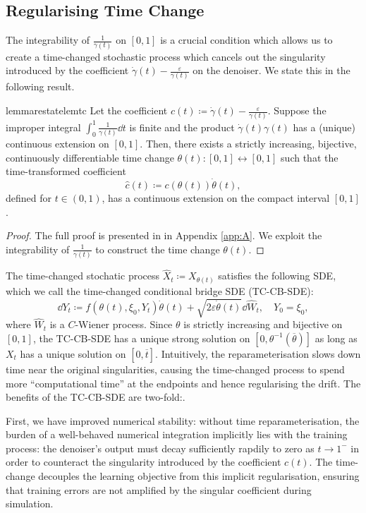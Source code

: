 \subsection{Regularising Time Change}\label{sec:tc}
The integrability of \(\frac{1}{\gamma(t)}\) on \([0, 1]\) is a crucial condition which allows us to create a time-changed stochastic process which cancels out the singularity introduced by the coefficient \(\dot{\gamma}(t) - \frac{\varepsilon}{\gamma(t)}\) on the denoiser. We state this in the following result.
\begin{theorembox}
  \begin{restatable}{lemma}{restatelemtc}\label{lem:tc}
    Let the coefficient \(c(t) \coloneqq \dot{\gamma}(t) - \frac{\varepsilon}{\gamma(t)}\). Suppose the improper integral \(\int_{0}^{1} \frac{1}{\gamma(t)} \dd{t}\) is finite and the product \(\dot{\gamma}(t) \gamma(t) \) has a (unique) continuous extension on \([0, 1]\). Then, there exists a strictly increasing, bijective, continuously differentiable time change \(\theta(t) : [0,1] \leftrightarrow [0, 1]\) such that the time-transformed coefficient
    \[
      \hat{c}(t) \coloneqq c(\theta(t))\dot{\theta}(t),
    \]
    defined for \(t \in (0, 1)\), has a continuous extension on the compact interval \([0, 1]\).
  \end{restatable}
\end{theorembox}
\begin{proof}
  The full proof is presented in  in Appendix \ref{app:A}. We exploit the integrability of \(\frac{1}{\gamma(t)}\) to construct the time change \(\theta(t)\).
\end{proof}
The time-changed stochatic process \(\hat{X}_{t} \coloneqq X_{\theta(t)}\) satisfies the following SDE, which we call the time-changed conditional bridge SDE (TC-CB-SDE):
\[
  \dd{Y_{t}} \coloneqq f(\theta(t), \xi_{0}, Y_{t}) \dot{\theta}(t) + \sqrt{2\varepsilon \dot{\theta}(t)} \dd{ \hat{W}_{t}}, \quad Y_{0} = \xi_{0},
\]
where \(\hat{W}_{t}\)  is a \(C\)-Wiener process. Since \(\theta\) is strictly increasing and bijective on \([0, 1]\), the TC-CB-SDE has a unique strong solution on \([0, \theta^{-1}(\overline{\theta})]\) as long as \(X_{t}\) has a unique solution on \([0, \overline{t}]\). Intuitively, the reparameterisation slows down time near the original singularities, causing the time-changed process to spend more ``computational time'' at the endpoints and hence regularising the drift. The benefits of the TC-CB-SDE are two-fold:.

First, we have improved numerical stability:  without time reparameterisation, the burden of a well-behaved numerical integration implicitly lies with the training process: the denoiser's output must decay sufficiently rapdily to zero as \(t \to 1^{-}\) in order to counteract the singularity introduced by the coefficient \(c(t)\). The time-change decouples the learning objective from this implicit regularisation, ensuring that training errors are not amplified by the singular coefficient during simulation.

